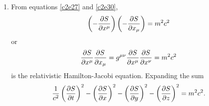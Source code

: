 \begin{enumerate}
\item From equations \eqref{c2e27} and \eqref{c2e30},
\[
\left(-\frac{\partial{S}}{\partial{x^\mu}}\right)\left(-\frac{\partial{S}}{\partial{x_\mu}}\right) = m^2c^2
\]
or
\begin{equation}\label{c2e34}
\frac{\partial{S}}{\partial{x^\mu}}\frac{\partial{S}}{\partial{x_\mu}} = g^{\mu\nu}\frac{\partial{S}}{\partial{x^\mu}}\frac{\partial{S}}{\partial{x^\nu}} = m^2c^2
\end{equation}
is the relativistic Hamilton-Jacobi equation. Expanding the sum
\begin{equation}\label{c2e35}
\frac{1}{c^2}\left(\frac{\partial{S}}{\partial{t}}\right)^2 - \left(\frac{\partial{S}}{\partial{x}}\right)^2 
- \left(\frac{\partial{S}}{\partial{y}}\right)^2 - \left(\frac{\partial{S}}{\partial{z}}\right)^2 = m^2c^2.
\end{equation}
\end{enumerate}